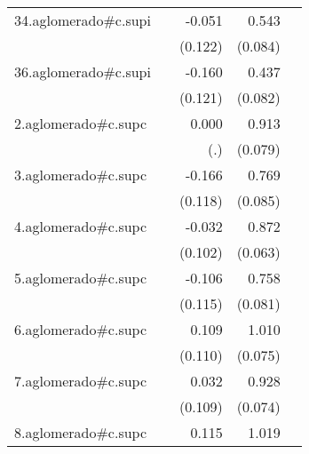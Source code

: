{\begin{longtable}{l*{4}{D{.}{.}{-1}}}
\addlinespace
34.aglomerado#c.supi&                     &      -0.051         &       0.543\sym{***}&                     \\
            &                     &     (0.122)         &     (0.084)         &                     \\
\addlinespace
36.aglomerado#c.supi&                     &      -0.160         &       0.437\sym{***}&                     \\
            &                     &     (0.121)         &     (0.082)         &                     \\
\addlinespace
2.aglomerado#c.supc&                     &       0.000         &       0.913\sym{***}&                     \\
            &                     &         (.)         &     (0.079)         &                     \\
\addlinespace
3.aglomerado#c.supc&                     &      -0.166         &       0.769\sym{***}&                     \\
            &                     &     (0.118)         &     (0.085)         &                     \\
\addlinespace
4.aglomerado#c.supc&                     &      -0.032         &       0.872\sym{***}&                     \\
            &                     &     (0.102)         &     (0.063)         &                     \\
\addlinespace
5.aglomerado#c.supc&                     &      -0.106         &       0.758\sym{***}&                     \\
            &                     &     (0.115)         &     (0.081)         &                     \\
\addlinespace
6.aglomerado#c.supc&                     &       0.109         &       1.010\sym{***}&                     \\
            &                     &     (0.110)         &     (0.075)         &                     \\
\addlinespace
7.aglomerado#c.supc&                     &       0.032         &       0.928\sym{***}&                     \\
            &                     &     (0.109)         &     (0.074)         &                     \\
\addlinespace
8.aglomerado#c.supc&                     &       0.115         &       1.019\sym{***}&                     \\

\end{longtable}}
